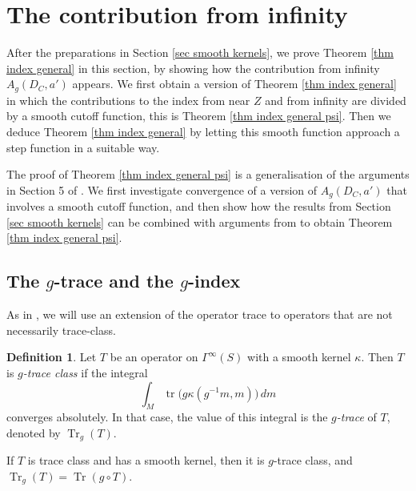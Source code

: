 \documentclass[11pt]{article}
\theoremstyle{plain}
\theoremstyle{definition}
\newtheorem{definition}[theorem]{Definition}
\theoremstyle{remark}
\numberwithin{equation}{section}
\DeclareMathOperator{\Tr}{Tr}
\DeclareMathOperator{\tr}{tr}
\begin{document}
\section{The contribution from infinity} \label{sec proof index thm}

After the preparations in Section \ref{sec smooth kernels}, we prove Theorem \ref{thm index general} in this section, by showing how the contribution from infinity $A_{g}(D_C, a')$ appears. We first obtain a version of Theorem \ref{thm index general} in which the contributions to the index from near $Z$ and from infinity are divided by a smooth cutoff function, this is Theorem \ref{thm index general psi}. Then we deduce Theorem \ref{thm index general} by letting this smooth function approach a step function in a suitable way.

The proof of  Theorem \ref{thm index general psi}  is a generalisation of the arguments in Section 5 of \cite{HWW}.
We first investigate convergence of a version of $A_{g}(D_C, a')$ that involves a smooth cutoff function, and then show how the results from Section \ref{sec smooth kernels} can be combined with arguments from \cite{HWW} to obtain  Theorem \ref{thm index general psi}.


\subsection{The $g$-trace and the $g$-index}

As in \cite{HWW, HW2}, we will use an extension of the operator trace to operators that are not necessarily trace-class.


\begin{definition}\label{def g trace}
Let $T$ be an operator on $\Gamma^{\infty}(S)$ with a smooth kernel $\kappa$.
Then $T$ is \emph{$g$-trace class} if the integral
\[
\int_M \tr \bigl( g\kappa(g^{-1}m,m) \bigr)\, dm
\]
converges absolutely. In that case, the value of this integral is the \emph{$g$-trace} of $T$, denoted by $\Tr_g(T)$.
\end{definition}
If $T$ is trace class and has a smooth kernel, then it is $g$-trace class, and $\Tr_g(T) = \Tr(g\circ T)$.
\end{document}
